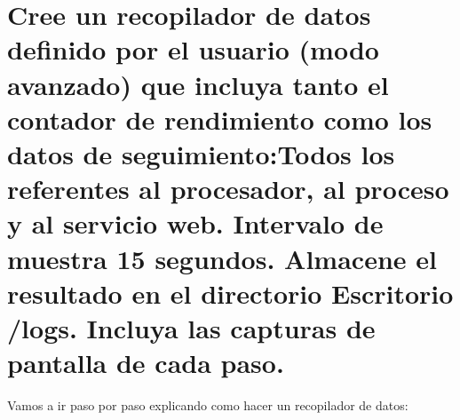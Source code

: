 	
	\section{Cree un recopilador de datos definido por el usuario (modo avanzado) que incluya tanto el contador de rendimiento como los datos de seguimiento:Todos los referentes al procesador, al proceso y al servicio web. Intervalo de muestra 15 segundos. Almacene el resultado en el directorio Escritorio /logs. Incluya las capturas de pantalla de cada paso.}
	
	Vamos a ir paso por paso explicando como hacer un recopilador de datos:
